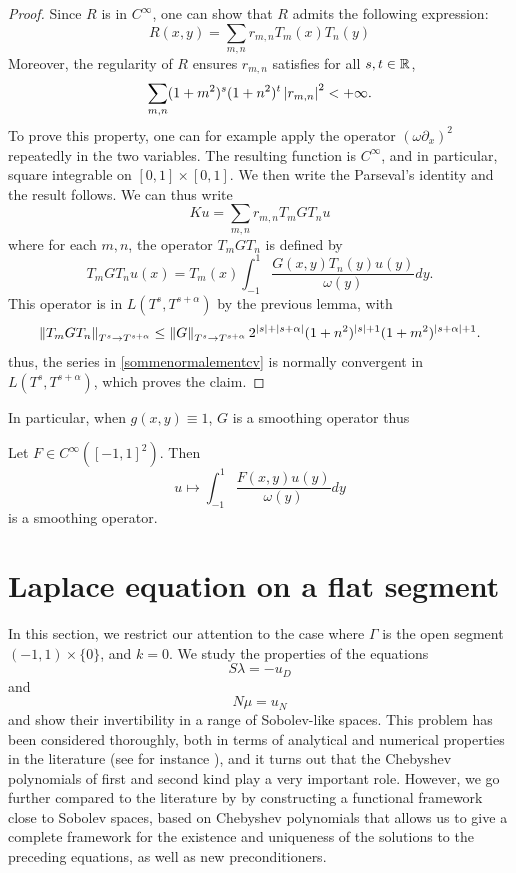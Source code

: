 \documentclass[a4paper]{article}
\begin{document}
\begin{proof}
	Since $R$ is in $C^{\infty}$, one can show that $R$ admits the following expression:
	\begin{equation}
	R(x,y) = \sum_{m,n} r_{m,n} T_m(x) T_n(y)
	\label{sommenormalementcv}
	\end{equation}
	Moreover, the regularity of $R$ ensures $r_{m,n}$ satisfies for all $s,t \in \mathbb{R}$, 
	\[\sum_{m,n} (1 + m^2)^s (1 + n^2)^t\left\lvert r_{m,n} \right\rvert^2 < +\infty.\] 
	To prove this property, one can for example apply the operator $(\omega \partial_x)^2$ repeatedly in the two variables. The resulting function is $C^\infty$, and in particular, square integrable on $[0,1] \times [0,1]$. We then write the Parseval's identity and the result follows. We can thus write 
	\[Ku = \sum_{m,n} r_{m,n} T_m G T_n u  \]
	where for each $m,n$, the operator $T_m G T_n$ is defined by 
	\[ T_m G T_n u (x)= T_m(x) \int_{-1}^{1} \dfrac{G(x,y) T_n(y)u(y)}{\omega(y)}dy.\]
	This operator is in $L(T^s,T^{s+\alpha})$ by the previous lemma, with 	
	\[\left\|T_m G T_n\right\|_{T^s \to T^{s+\alpha}} \leq \left\|G\right\|_{T^s \to T^{s + \alpha}} 2^{\left\lvert s \right\rvert + \left\lvert s + \alpha \right\rvert}(1 + n^2)^{\left\lvert s \right\rvert+1}(1 + m^2)^{\left\lvert s+ \alpha \right\rvert + 1}.\]
	thus, the series in \eqref{sommenormalementcv} is normally convergent in $L(T^s, T^{s + \alpha})$, which proves the claim. 
\end{proof}
In particular, when $g(x,y) \equiv 1$, $G$ is a smoothing operator thus
\begin{Cor}
	\label{lemSmoothingOp}
	Let $F \in C^{\infty}([-1,1]^2)$. Then
	\[ u \mapsto \int_{-1}^{1} \frac{F(x,y)u(y)}{\omega(y)}dy\]
	is a smoothing operator. 
\end{Cor}

\section{Laplace equation on a flat segment}

In this section, we restrict our attention to the case where $\Gamma$ is the open segment $(-1,1) \times \{0\}$, and $k=0$. We study the properties of the equations 
\[S\lambda = -u_D\]
and 
\[N\mu = u_N\]
and show their invertibility in a range of Sobolev-like spaces. This problem has been considered thoroughly, both
in terms of analytical and numerical properties in the literature (see for instance \cite{jiang2004second,bruno2012second}), and it turns out that the Chebyshev polynomials of first and second kind play a very important role. However, we go further compared to the literature by 
by constructing a functional framework close to Sobolev spaces, based on Chebyshev polynomials that
allows us to give a complete framework for the existence and uniqueness of the solutions to the preceding equations, as well as
new preconditioners.
\end{document}
